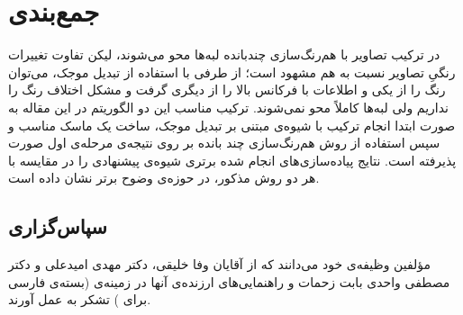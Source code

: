\documentclass[11pt,a4paper,twocolumn]{article}
\numberwithin{table}{section}
\begin{document}
\section{جمع‌بندی}\label{Sec:Conclusion}
 در ترکیب تصاویر با هم‌رنگ‌سازی چندبانده لبه‌ها محو می‌شوند، لیکن  تفاوت  تغییرات رنگیِ تصاویر نسبت به هم مشهود است؛ از طرفی با استفاده از تبدیل موجک، می‌توان رنگ را از یکی و اطلاعات با فرکانس بالا را از دیگری گرفت و مشکل اختلاف رنگ را نداریم ولی لبه‌ها کاملاً محو نمی‌شوند. ترکیب مناسب این دو الگوریتم در این مقاله به صورت ابتدا انجام ترکیب با شیوه‌ی مبتنی بر تبدیل موجک، ساخت یک ماسک مناسب و سپس استفاده از روش هم‌رنگ‌سازی چند بانده بر روی نتیجه‌ی مرحله‌ی اول صورت پذیرفته است. نتایج پیاده‌سازی‌های انجام شده برتری شیوه‌ی پیشنهادی را در مقایسه با هر دو روش مذکور، در حوزه‌ی وضوح برتر  نشان داده است.
 
\subsection*{سپاس‌گزاری}
مؤلفین وظیفه‌ی خود می‌دانند که از آقایان وفا خلیقی، دکتر مهدی امیدعلی و دکتر مصطفی واحدی
بابت زحمات و راهنمایی‌های ارزنده‌ی آنها در زمینه‌ی \lr{\XePersian} (بسته‌ی فارسی برای \lr{\LaTeX})  تشکر به عمل آورند. 
\end{document}
